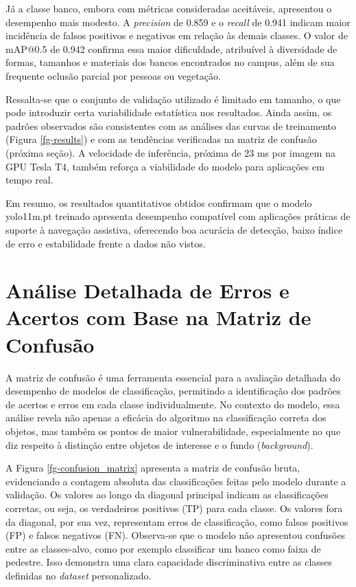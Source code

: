 Já a classe banco, embora com métricas consideradas aceitáveis, apresentou o desempenho mais modesto. A \textit{precision} de 0.859 e o \textit{recall} de 0.941 indicam maior incidência de falsos positivos e negativos em relação às demais classes. O valor de mAP@0.5 de 0.942 confirma essa maior dificuldade, atribuível à diversidade de formas, tamanhos e materiais dos bancos encontrados no campus, além de sua frequente oclusão parcial por pessoas ou vegetação.

Ressalta-se que o conjunto de validação utilizado é limitado em tamanho, o que pode introduzir certa variabilidade estatística nos resultados. Ainda assim, os padrões observados são consistentes com as análises das curvas de treinamento (Figura \ref{fg-results}) e com as tendências verificadas na matriz de confusão (próxima seção). A velocidade de inferência, próxima de 23 ms por imagem na GPU Tesla T4, também reforça a viabilidade do modelo para aplicações em tempo real.

Em resumo, os resultados quantitativos obtidos confirmam que o modelo yolo11m.pt treinado apresenta desempenho compatível com aplicações práticas de suporte à navegação assistiva, oferecendo boa acurácia de detecção, baixo índice de erro e estabilidade frente a dados não vistos.

\section{\textbf{Análise Detalhada de Erros e Acertos com Base na Matriz de Confusão}}

A matriz de confusão é uma ferramenta essencial para a avaliação detalhada do desempenho de modelos de classificação, permitindo a identificação dos padrões de acertos e erros em cada classe individualmente. No contexto do modelo, essa análise revela não apenas a eficácia do algoritmo na classificação correta dos objetos, mas também os pontos de maior vulnerabilidade, especialmente no que diz respeito à distinção entre objetos de interesse e o fundo (\textit{background}).

A Figura \ref{fg-confusion_matrix} apresenta a matriz de confusão bruta, evidenciando a contagem absoluta das classificações feitas pelo modelo durante a validação. Os valores ao longo da diagonal principal indicam as classificações corretas, ou seja, os verdadeiros positivos (TP) para cada classe. Os valores fora da diagonal, por sua vez, representam erros de classificação, como falsos positivos (FP) e falsos negativos (FN). Observa-se que o modelo não apresentou confusões entre as classes-alvo, como por exemplo classificar um banco como faixa de pedestre. Isso demonstra uma clara capacidade discriminativa entre as classes definidas no \textit{dataset} personalizado.

